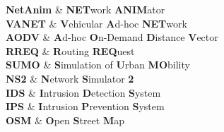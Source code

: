 \documentclass[12pt, a4paper, oneside]{Thesis} %
\begin{document}


\pagestyle{fancy}

\tableofcontents %

\listoffigures %

\listoftables %
\clearpage  %
{
\textbf{NetAnim} & \textbf{NET}work \textbf{ANIM}ator \\

\textbf{VANET} & \textbf{V}ehicular \textbf{A}d-hoc \textbf{NET}work  \\

\textbf{AODV} & \textbf{A}d-hoc \textbf{O}n-Demand \textbf{D}istance  \textbf{V}ector  \\

\textbf{RREQ} & \textbf{R}outing \textbf{REQ}uest \\

\textbf{SUMO} & \textbf{S}imulation of \textbf{U}rban \textbf{MO}bility \\

\textbf{NS2} & \textbf{N}etwork \textbf{S}imulator \textbf{2}  \\

\textbf{IDS} & \textbf{I}ntrusion \textbf{D}etection \textbf{S}ystem  \\

\textbf{IPS} & \textbf{I}ntrusion \textbf{P}revention \textbf{S}ystem  \\

\textbf{OSM} & \textbf{O}pen \textbf{S}treet \textbf{M}ap  \\
}

\clearpage
\end{document}
